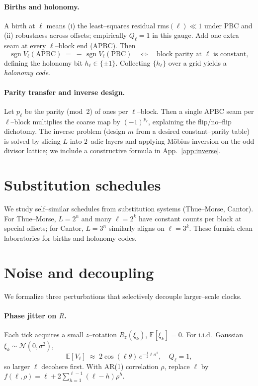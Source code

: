 \documentclass[11pt]{article}
\newcommand{\APBC}{\mathrm{APBC}}
\newcommand{\PBC}{\mathrm{PBC}}
\newcommand{\sgn}{\operatorname{sgn}}
\begin{document}
\paragraph{Births and holonomy.} A birth at $\ell$ means (i) the least--squares residual rms$(\ell)\ll 1$ under PBC and (ii) robustness across offsets; empirically $Q_\ell=1$ in this gauge. Add one extra seam at every $\ell$--block end (APBC). Then
\begin{equation}
\sgn V_\ell(\APBC) \;=\; -\,\sgn V_\ell(\PBC)\quad \Leftrightarrow\quad 
\text{block parity at }\ell\text{ is constant},
\end{equation}
defining the holonomy bit $h_\ell\in\{\pm1\}$. Collecting $\{h_\ell\}$ over a grid yields a \emph{holonomy code}.

\paragraph{Parity transfer and inverse design.}
Let $p_\ell$ be the parity (mod~2) of ones per $\ell$--block. Then a single APBC seam per $\ell$--block multiplies the coarse map by $(-1)^{p_\ell}$, explaining the flip/no--flip dichotomy. The inverse problem (design $m$ from a desired constant--parity table) is solved by slicing $L$ into $2$--adic layers and applying Möbius inversion on the odd divisor lattice; we include a constructive formula in App.~\ref{app:inverse}.

\section{Substitution schedules}
We study self--similar schedules from substitution systems (Thue--Morse, Cantor). For Thue--Morse, $L=2^n$ and many $\ell=2^k$ have constant counts per block at special offsets; for Cantor, $L=3^n$ similarly aligns on $\ell=3^k$. These furnish clean laboratories for births and holonomy codes.

\section{Noise and decoupling}\label{sec:noise}
We formalize three perturbations that selectively decouple larger--scale clocks.
\paragraph{Phase jitter on $R$.}
Each tick acquires a small $z$--rotation $R_z(\xi_k)$, $\mathbb{E}[\xi_k]=0$. For i.i.d.\ Gaussian $\xi_k\sim\mathcal N(0,\sigma^2)$,
\begin{equation}
\mathbb{E}[V_\ell]\;\approx\;2\cos(\ell\theta)\,e^{-\tfrac12\ell\sigma^2},\quad Q_\ell=1,
\end{equation}
so larger $\ell$ decohere first. With AR(1) correlation $\rho$, replace $\ell$ by $f(\ell,\rho)=\ell+2\sum_{h=1}^{\ell-1}(\ell-h)\rho^h$.
\end{document}
